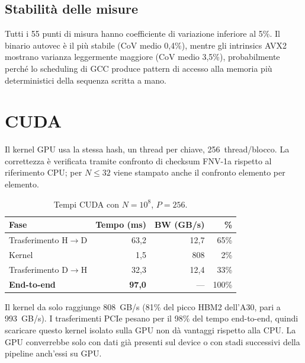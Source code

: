 \documentclass[10pt,a4paper,twocolumn]{article}
\begin{document}
\subsection{Stabilità delle misure}

Tutti i 55 punti di misura hanno coefficiente di variazione inferiore al 5\%. Il binario autovec è il più stabile (CoV medio 0,4\%), mentre gli intrinsics AVX2 mostrano varianza leggermente maggiore (CoV medio 3,5\%), probabilmente perché lo scheduling di GCC produce pattern di accesso alla memoria più deterministici della sequenza scritta a mano.

\section{CUDA}
\label{sec:cuda}

Il kernel GPU usa la stessa hash, un thread per chiave, 256~thread/blocco. La correttezza è verificata tramite confronto di checksum FNV-1a rispetto al riferimento CPU; per $N\!\leq\!32$ viene stampato anche il confronto elemento per elemento.

\begin{table}[h]
\centering\small
\begin{tabular}{@{}lrrr@{}}
\toprule
\textbf{Fase} & \textbf{Tempo (ms)} & \textbf{BW (GB/s)} & \textbf{\%} \\
\midrule
Trasferimento H$\to$D & 63,2 & 12,7 & 65\% \\
Kernel                &  1,5 & 808  &  2\% \\
Trasferimento D$\to$H & 32,3 & 12,4 & 33\% \\
\midrule
\textbf{End-to-end} & \textbf{97,0} & --- & 100\% \\
\bottomrule
\end{tabular}
\caption{Tempi CUDA con $N\!=\!10^8$, $P\!=\!256$.}
\label{tab:cuda}
\end{table}

Il kernel da solo raggiunge 808~GB/s (81\% del picco HBM2 dell'A30, pari a 993~GB/s). I trasferimenti PCIe pesano per il 98\% del tempo end-to-end, quindi scaricare questo kernel isolato sulla GPU non dà vantaggi rispetto alla CPU. La GPU converrebbe solo con dati già presenti sul device o con stadi successivi della pipeline anch'essi su GPU.

\end{document}

